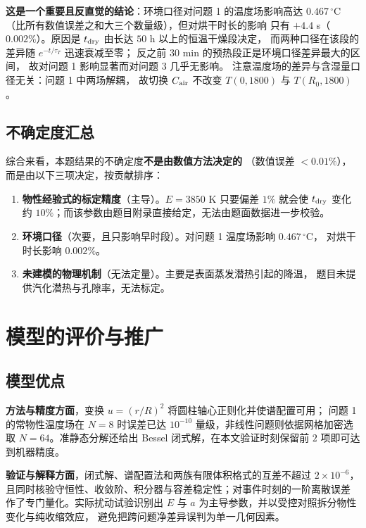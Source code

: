 \documentclass[withoutpreface,bwprint]{cumcmthesis}
\begin{document}
\textbf{这是一个重要且反直觉的结论}：环境口径对问题 1 的温度场影响高达
$0.467\,^\circ$C（比所有数值误差之和大三个数量级），但对烘干时长的影响
只有 $+4.4$ s（$0.002\%$）。原因是 $t_{\rm dry}$ 由长达 $50$ h 以上的恒温干燥段决定，
而两种口径在该段的差异随 $e^{-t/\tau_T}$ 迅速衰减至零；
反之前 $30$ min 的预热段正是环境口径差异最大的区间，
故对问题 1 影响显著而对问题 3 几乎无影响。
注意温度场的差异与含湿量口径无关：问题 1 中两场解耦，
故切换 $C_{\rm air}$ 不改变 $T(0,1800)$ 与 $T(R_0,1800)$。

\subsection{不确定度汇总}

综合来看，本题结果的不确定度\textbf{不是由数值方法决定的}
（数值误差 $<0.01\%$），而是由以下三项决定，按贡献排序：

\begin{enumerate}[leftmargin=1.9em,itemsep=2pt]
\item \textbf{物性经验式的标定精度}（主导）。$E=3850$ K 只要偏差 $1\%$ 就会使
$t_{\rm dry}$ 变化约 $10\%$；而该参数由题目附录直接给定，无法由题面数据进一步校验。
\item \textbf{环境口径}（次要，且只影响早时段）。对问题 1 温度场影响 $0.467\,^\circ$C，
对烘干时长影响 $0.002\%$。
\item \textbf{未建模的物理机制}（无法定量）。主要是表面蒸发潜热引起的降温，
题目未提供汽化潜热与孔隙率，无法标定。
\end{enumerate}

\section{模型的评价与推广}
\label{sec:eval}

\subsection{模型优点}

\textbf{方法与精度方面}，变换 $u=(r/R)^2$ 将圆柱轴心正则化并使谱配置可用；
问题 1 的常物性温度场在 $N=8$ 时误差已达 $10^{-10}$ 量级，非线性问题则依据网格加密选取
$N=64$。准静态分解还给出 Bessel 闭式解，在本文验证时刻保留前 $2$ 项即可达到机器精度。

\textbf{验证与解释方面}，闭式解、谱配置法和两族有限体积格式的互差不超过
$2\times10^{-6}$，且同时核验守恒性、收敛阶、积分器与容差稳定性；对事件时刻的一阶离散误差
作了专门量化。实际扰动试验识别出 $E$ 与 $a$ 为主导参数，并以受控对照拆分物性变化与纯收缩效应，
避免把跨问题净差异误判为单一几何因素。
\end{document}
